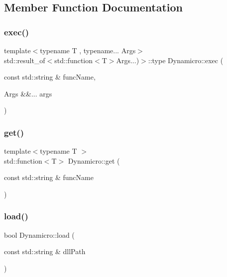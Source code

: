 \subsection{Member Function Documentation}
\mbox{\label{class_dynamicro_a6aa58c6eaee11117ee74462ad4c3325e}} 
\subsubsection{\texorpdfstring{exec()}{exec()}}
{\footnotesize\ttfamily template$<$typename T , typename... Args$>$ \\
std\+::result\+\_\+of$<$std\+::function$<$T$>$Args...)$>$\+::type Dynamicro\+::exec (\begin{DoxyParamCaption}\item[{const std\+::string \&}]{func\+Name,  }\item[{Args \&\&...}]{args }\end{DoxyParamCaption})\hspace{0.3cm}{\ttfamily [inline]}}

\mbox{\label{class_dynamicro_a40444463dc44ec4c54af99a45b9a7efe}} 
\subsubsection{\texorpdfstring{get()}{get()}}
{\footnotesize\ttfamily template$<$typename T $>$ \\
std\+::function$<$T$>$ Dynamicro\+::get (\begin{DoxyParamCaption}\item[{const std\+::string \&}]{func\+Name }\end{DoxyParamCaption})\hspace{0.3cm}{\ttfamily [inline]}}

\mbox{\label{class_dynamicro_a137bec04fec010015a1ee72eba03b77e}} 
\subsubsection{\texorpdfstring{load()}{load()}}
{\footnotesize\ttfamily bool Dynamicro\+::load (\begin{DoxyParamCaption}\item[{const std\+::string \&}]{dll\+Path }\end{DoxyParamCaption})}

